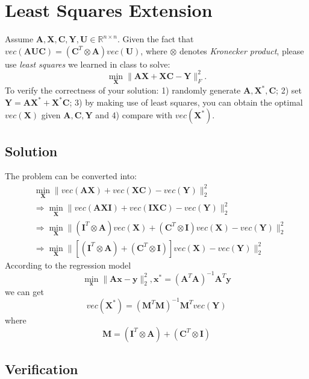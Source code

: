 \documentclass[11pt]{article}
\newcommand{\R}{\mathbb{R}}
\newcommand{\maximize}{\operatorname*{maximize}}
\newcommand{\mtx}[1]{\mathbf{#1}}
\newcommand{\vct}[1]{\mathbf{#1}}
\def \mA {\mtx{A}}
\def \mC {\mtx{C}}
\def \mI {\mtx{I}}
\def \mU {\mtx{U}}
\def \mS {\mtx{S}}
\def \mX {\mtx{X}}
\def \mY {\mtx{Y}}
\def \vx {\vct{x}}
\def \vy {\vct{y}}
\def \R {\mathbb{R}}
\begin{document}
\section{Least Squares Extension}
Assume $\mA, \mX, \mC, \mY, \mU \in\R^{n\times n}$. Given the fact that $vec(\mA\mU\mC)=(\mC^T\otimes\mA)vec(\mU)$, where $\otimes$ denotes \textit{Kronecker product}, please use \textit{least squares} we learned in class to solve:
\begin{equation}
	\min_\mX \|\mA\mX+\mX\mC-\mY\|_F^2.
\end{equation}
To verify the correctness of your solution: 1) randomly generate $\mA, \mX^*, \mC$; 2) set $\mY=\mA\mX^*+\mX^*\mC$; 3) by making use of least squares, you can obtain the optimal $vec(\mX)$ given $\mA, \mC, \mY$  and 4) compare with $vec(\mX^*)$.
\subsection{Solution}
The problem can be converted into:
\begin{align*}
	&\min_\mX \|vec(\mA\mX)+vec(\mX\mC)-vec(\mY)\|_2^2\\
	& \Rightarrow\min_\mX \|vec(\mA\mX\mI)+vec(\mI\mX\mC)-vec(\mY)\|_2^2\\
	& \Rightarrow \min_\mX \|(\mI^T\otimes\mA)vec(\mX)+(\mC^T\otimes\mI)vec(\mX)-vec(\mY)\|_2^2\\
	& \Rightarrow \min_\mX \|[(\mI^T\otimes\mA)+(\mC^T\otimes\mI)]vec(\mX)-vec(\mY)\|_2^2
\end{align*} 
According to the regression model 
$$ \min_\vx \|\mA\vx-\vy\|^2_2, \vx^* = (\mA^T\mA)^{-1}\mA^T\vy$$
we can get 
\begin{equation}
	vec(\mX^*) = (\mtx{M}^T\mtx{M})^{-1}\mtx{M}^Tvec(\mY)
\end{equation}
where
$$\mtx{M} =  (\mI^T\otimes\mA)+(\mC^T\otimes\mI)$$
\subsection{Verification}
\vspace{4cm}
\end{document}
